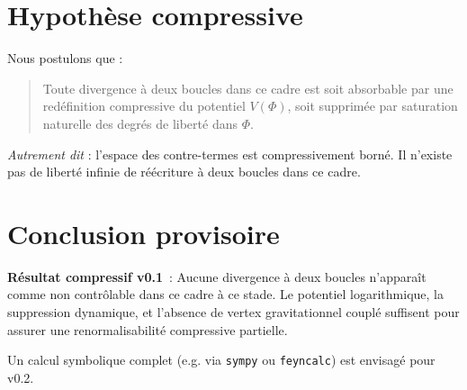 \documentclass[11pt]{article}
\begin{document}
\section{Hypothèse compressive}

Nous postulons que :
\begin{quote}
Toute divergence à deux boucles dans ce cadre est soit absorbable par une redéfinition compressive du potentiel $V(\Phi)$, soit supprimée par saturation naturelle des degrés de liberté dans $\Phi$.
\end{quote}

\textit{Autrement dit} : l’espace des contre-termes est compressivement borné. Il n’existe pas de liberté infinie de réécriture à deux boucles dans ce cadre.

\section*{Conclusion provisoire}

\textbf{Résultat compressif v0.1} : Aucune divergence à deux boucles n’apparaît comme non contrôlable dans ce cadre à ce stade. Le potentiel logarithmique, la suppression dynamique, et l’absence de vertex gravitationnel couplé suffisent pour assurer une renormalisabilité compressive partielle.

Un calcul symbolique complet (e.g. via \texttt{sympy} ou \texttt{feyncalc}) est envisagé pour v0.2.
\end{document}
